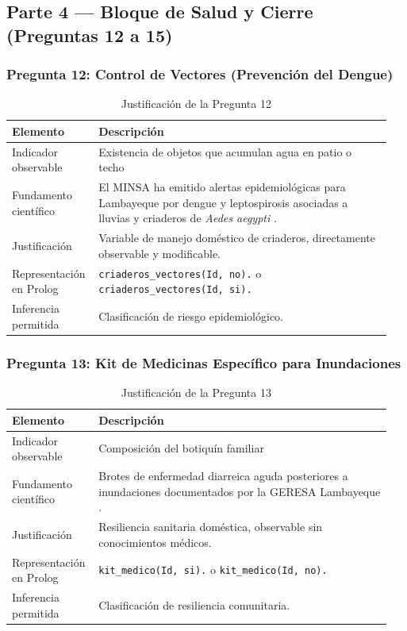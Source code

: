 \documentclass[12pt, letterpaper]{article}
\begin{document}
\subsection{Parte 4 — Bloque de Salud y Cierre (Preguntas 12 a 15)}

\subsubsection*{Pregunta 12: Control de Vectores (Prevención del Dengue)}
\begin{table}[H]
\centering
\caption{Justificación de la Pregunta 12}
\label{tab:p12}
\begin{tabular}{@{}p{0.2\linewidth}p{0.75\linewidth}@{}}
\toprule
\textbf{Elemento} & \textbf{Descripción} \\ \midrule
Indicador observable & Existencia de objetos que acumulan agua en patio o techo \\
Fundamento científico & El MINSA ha emitido alertas epidemiológicas para Lambayeque por dengue y leptospirosis asociadas a lluvias y criaderos de \textit{Aedes aegypti} \parencite{minsa_alerta_2023}. \\
Justificación & Variable de manejo doméstico de criaderos, directamente observable y modificable. \\
Representación en Prolog & \texttt{criaderos\_vectores(Id, no).} o \texttt{criaderos\_vectores(Id, si).} \\
Inferencia permitida & Clasificación de riesgo epidemiológico. \\ \bottomrule
\end{tabular}
\end{table}

\subsubsection*{Pregunta 13: Kit de Medicinas Específico para Inundaciones}
\begin{table}[H]
\centering
\caption{Justificación de la Pregunta 13}
\label{tab:p13}
\begin{tabular}{@{}p{0.2\linewidth}p{0.75\linewidth}@{}}
\toprule
\textbf{Elemento} & \textbf{Descripción} \\ \midrule
Indicador observable & Composición del botiquín familiar \\
Fundamento científico & Brotes de enfermedad diarreica aguda posteriores a inundaciones documentados por la GERESA Lambayeque \parencite{geresa_sala}. \\
Justificación & Resiliencia sanitaria doméstica, observable sin conocimientos médicos. \\
Representación en Prolog & \texttt{kit\_medico(Id, si).} o \texttt{kit\_medico(Id, no).} \\
Inferencia permitida & Clasificación de resiliencia comunitaria. \\ \bottomrule
\end{tabular}
\end{table}
\end{document}
